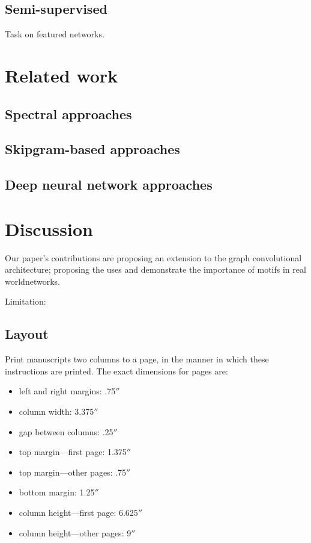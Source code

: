 \documentclass{article}
\theoremstyle{definition}
\begin{document}
\subsection{Semi-supervised}

Task on featured networks.

\section{Related work}

\subsection{Spectral approaches}

\subsection{Skipgram-based approaches }

\subsection{Deep neural network approaches}

\section{Discussion}

Our paper's contributions are proposing an extension to the graph convolutional 
architecture; proposing the uses and demonstrate the importance of motifs in
real worldnetworks.

Limitation: 

\subsection{Layout}

Print manuscripts two columns to a page, in the manner in which these
instructions are printed. The exact dimensions for pages are:
\begin{itemize}
\item left and right margins: .75$''$
\item column width: 3.375$''$
\item gap between columns: .25$''$
\item top margin---first page: 1.375$''$
\item top margin---other pages: .75$''$
\item bottom margin: 1.25$''$
\item column height---first page: 6.625$''$
\item column height---other pages: 9$''$
\end{itemize}
\end{document}
